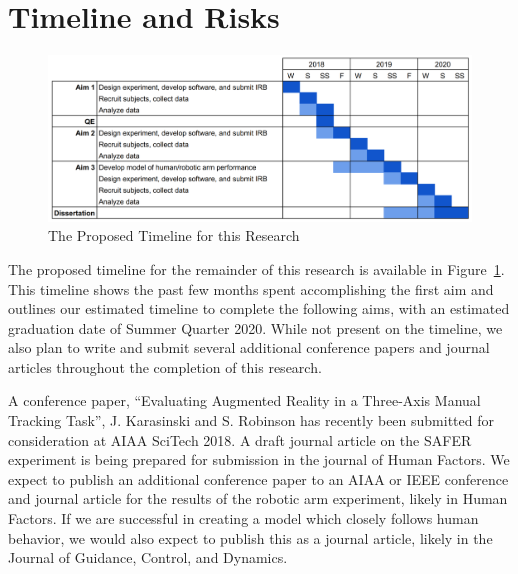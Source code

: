\documentclass[float=false, crop=false]{standalone}
\begin{document}
\section{Timeline and Risks}

\begin{figure}[h!]
    \begin{center}
        \includegraphics[width=\linewidth]{./../img/image1.png}
        \caption{The Proposed Timeline for this Research}
        \label{timeline}
    \end{center}
\end{figure}

The proposed timeline for the remainder of this research is available in Figure~\ref{timeline}.
This timeline shows the past few months spent accomplishing the first aim and outlines our estimated timeline to complete the following aims, with an estimated graduation date of Summer Quarter 2020.
While not present on the timeline, we also plan to write and submit several additional conference papers and journal articles throughout the completion of this research.

A conference paper, ``Evaluating Augmented Reality in a Three-Axis Manual Tracking Task'', J. Karasinski and S. Robinson has recently been submitted for consideration at AIAA SciTech 2018.
A draft journal article on the SAFER experiment is being prepared for submission in the journal of Human Factors.
We expect to publish an additional conference paper to an AIAA or IEEE conference and journal article for the results of the robotic arm experiment, likely in Human Factors.
If we are successful in creating a model which closely follows human behavior, we would also expect to publish this as a journal article, likely in the Journal of Guidance, Control, and Dynamics.
\end{document}
